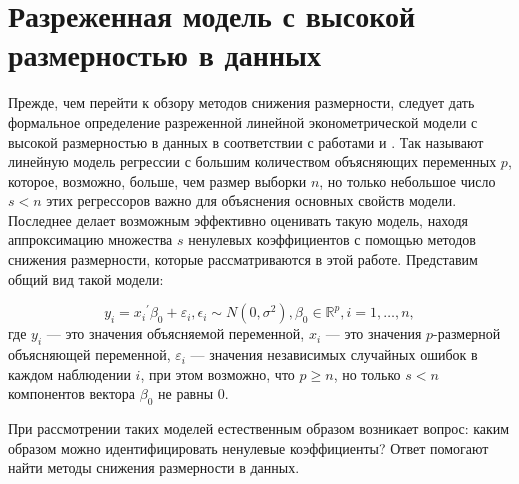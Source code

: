\section{Разреженная модель с высокой размерностью в данных}
Прежде, чем перейти к обзору методов снижения
размерности, следует дать формальное определение разреженной линейной
эконометрической модели с высокой размерностью в данных в соответствии с работами \cite{belloni2011high} и \cite{belloni2011ℓ1}. Так называют линейную
модель регрессии с большим количеством объясняющих переменных $p$, которое,
возможно, больше, чем размер выборки $n$, но только небольшое число $s<n$ этих
регрессоров важно для объяснения основных свойств модели. Последнее делает
возможным эффективно оценивать такую модель, находя аппроксимацию множества $s$
ненулевых коэффициентов с помощью методов снижения размерности, которые
рассматриваются в этой работе. Представим общий вид такой модели: 


\begin{equation} y_i = {x_i}^{'}
\beta_0 + \varepsilon_i, \epsilon_i \sim N(0, \sigma^2), \beta_0 \in
\mathbb{R}^p, i = 1, \dots, n, \end{equation} 
где $y_i$ --- это значения объясняемой
переменной, $x_i$ --- это значения $p$-размерной объясняющей переменной,
$\varepsilon_i$ --- значения независимых случайных ошибок в каждом наблюдении
$i$, при этом возможно, что $p \geq n$, но только $s<n$ компонентов вектора
$\beta_0$ не равны $0$.

При рассмотрении таких моделей естественным образом возникает вопрос: каким
образом можно идентифицировать ненулевые коэффициенты? Ответ помогают найти методы
снижения размерности в данных.

